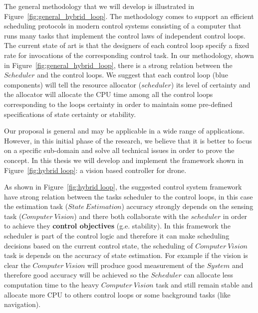 \documentclass[11pt]{article}
\begin{document}
The general methodology that we will develop is illustrated in Figure~\ref{fig:general_hybrid_loop}.
The methodology comes to support an efficient scheduling protocols in modern control systems consisting of a computer that runs many tasks that implement the control laws of independent control loops. 
The current state of art is that the designers of each control loop specify a fixed rate for invocations of the corresponding control task.
In our methodology, shown in Figure~\ref{fig:general_hybrid_loop}, there is a strong relation between the $Scheduler$ and the control loops. We suggest that each control loop (blue components) will tell the resource allocator ($scheduler$) its level of certainty and the allocator will allocate the CPU time among all the control loops corresponding to the loops certainty in order to maintain some pre-defined specifications of state certainty or stability.

Our proposal is general and may be applicable in a wide range of applications. However, in this initial phase of the research, we believe that it is better to focus on a specific sub-domain and solve all technical issues in order to prove the concept.
In this thesis we will develop and implement the framework shown in Figure~\ref{fig:hybrid loop}: a vision based controller for drone. 

As shown in Figure~\ref{fig:hybrid loop}, the suggested control system framework have strong relation between the tasks scheduler to the control loops, in this case the estimation task ($State~Estimation$) accuracy strongly depends on the sensing task ($Computer~Vision$) and there both collaborate with the $scheduler$ in order to achieve they \textbf{control objectives} (g.e. stability).
In this framework the scheduler is part of the control logic and therefore it can make scheduling decisions based on the current control state, the scheduling of $Computer~Vision$ task is depends on the accuracy of state estimation.
For example if the vision is clear the $Computer~Vision$ will produce good measurement of the $System$ and therefore good accuracy will be achieved so the $Scheduler$ can allocate less computation time to the heavy $Computer~Vision$ task and still remain stable and allocate more CPU to others control loops or some background tasks (like navigation).
\end{document}
